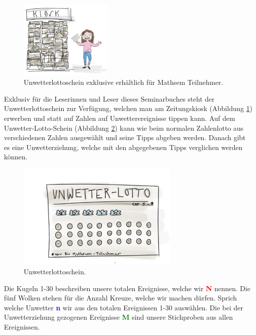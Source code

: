 \begin{refsection}
\begin{figure}[htbp]
\centering
\includegraphics[width=0.4\textwidth]{extrem/Kiosk.pdf}
\caption{Unwetterlottoschein exklusive erhältlich für Mathsem Teilnehmer.}
\label{Kiosk}
\end{figure}

Exklusiv für die Leserinnen und Leser dieses Seminarbuches steht der Unwetterlottoschein zur Verfügung, welchen man am Zeitungskiosk (Abbildung \ref{Kiosk}) erwerben und statt auf Zahlen auf Unwetterereignisse tippen kann. Auf dem Unwetter-Lotto-Schein (Abbildung \ref{Lottoschein}) kann wie beim normalen Zahlenlotto aus verschiedenen Zahlen ausgewählt und seine Tipps abgeben werden. Danach gibt es eine Unwetterziehung, welche mit den abgegebenen Tipps verglichen werden können.

\begin{figure}[htbp]
\centering
\includegraphics[width=0.7\textwidth]{extrem/Lottoschein.pdf}
\caption{Unwetterlottoschein.}
\label{Lottoschein}
\end{figure}

Die Kugeln 1-30 beschreiben unsere totalen Ereignisse, welche wir \textcolor{red}{\textbf{N}} nennen. Die fünf Wolken stehen für die Anzahl Kreuze, welche wir machen dürfen. Sprich welche Unwetter \textcolor{blue}{\textbf{n}} wir aus den totalen Ereignissen 1-30 auswählen. Die bei der Unwetterziehung gezogenen Ereignisse \textcolor{green}{\textbf{M}} sind unsere Stichproben aus allen Ereignissen.


\end{refsection}

